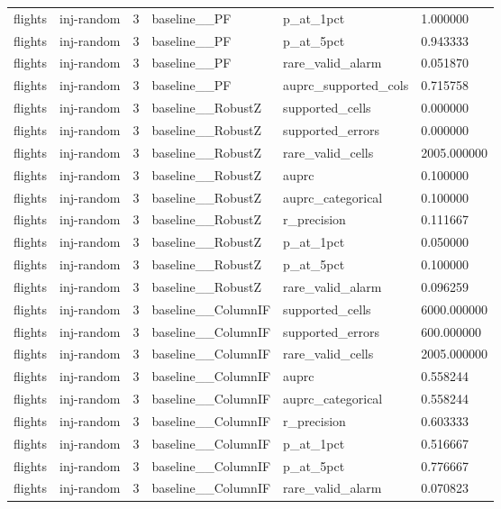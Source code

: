 \begin{tabular}{llllll}
flights & inj-random & 3 & baseline\_\_PF & p\_at\_1pct & 1.000000 \\
flights & inj-random & 3 & baseline\_\_PF & p\_at\_5pct & 0.943333 \\
flights & inj-random & 3 & baseline\_\_PF & rare\_valid\_alarm & 0.051870 \\
flights & inj-random & 3 & baseline\_\_PF & auprc\_supported\_cols & 0.715758 \\
flights & inj-random & 3 & baseline\_\_RobustZ & supported\_cells & 0.000000 \\
flights & inj-random & 3 & baseline\_\_RobustZ & supported\_errors & 0.000000 \\
flights & inj-random & 3 & baseline\_\_RobustZ & rare\_valid\_cells & 2005.000000 \\
flights & inj-random & 3 & baseline\_\_RobustZ & auprc & 0.100000 \\
flights & inj-random & 3 & baseline\_\_RobustZ & auprc\_categorical & 0.100000 \\
flights & inj-random & 3 & baseline\_\_RobustZ & r\_precision & 0.111667 \\
flights & inj-random & 3 & baseline\_\_RobustZ & p\_at\_1pct & 0.050000 \\
flights & inj-random & 3 & baseline\_\_RobustZ & p\_at\_5pct & 0.100000 \\
flights & inj-random & 3 & baseline\_\_RobustZ & rare\_valid\_alarm & 0.096259 \\
flights & inj-random & 3 & baseline\_\_ColumnIF & supported\_cells & 6000.000000 \\
flights & inj-random & 3 & baseline\_\_ColumnIF & supported\_errors & 600.000000 \\
flights & inj-random & 3 & baseline\_\_ColumnIF & rare\_valid\_cells & 2005.000000 \\
flights & inj-random & 3 & baseline\_\_ColumnIF & auprc & 0.558244 \\
flights & inj-random & 3 & baseline\_\_ColumnIF & auprc\_categorical & 0.558244 \\
flights & inj-random & 3 & baseline\_\_ColumnIF & r\_precision & 0.603333 \\
flights & inj-random & 3 & baseline\_\_ColumnIF & p\_at\_1pct & 0.516667 \\
flights & inj-random & 3 & baseline\_\_ColumnIF & p\_at\_5pct & 0.776667 \\
flights & inj-random & 3 & baseline\_\_ColumnIF & rare\_valid\_alarm & 0.070823 \\

\end{tabular}
